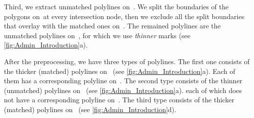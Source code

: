 Third, we extract unmatched polylines on~\ml. 
We split the boundaries of the polygons 
on~\ml at every intersection node, 
then we exclude all the split boundaries 
that overlay with the matched ones on~\ml. 
The remained polylines are the unmatched polylines on~\ml,
for which we use \emph{thinner} marks
(see \fig\ref{fig:Admin_Introduction}a). 

After the preprocessing, we have three types of polylines. 
The first one consists of 
the thicker (matched) polylines on~\ml
(see \fig\ref{fig:Admin_Introduction}a).
Each of them has a corresponding polyline on~\ms.
%
The second type consists of 
the thinner (unmatched) polylines on~\ml
(see \fig\ref{fig:Admin_Introduction}a).
each of which does not have a
corresponding polyline on~\ms.
%
The third type consists of 
the thicker (matched) polylines on~\ms
(see \fig\ref{fig:Admin_Introduction}d).


